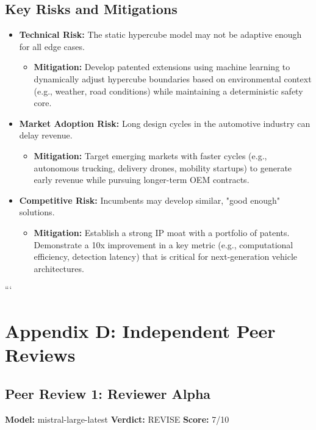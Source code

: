 \documentclass{article}
\begin{document}
\subsection{Key Risks and Mitigations}
\begin{itemize}
    \item \textbf{Technical Risk:} The static hypercube model may not be adaptive enough for all edge cases.
    \begin{itemize}
        \item \textbf{Mitigation:} Develop patented extensions using machine learning to dynamically adjust hypercube boundaries based on environmental context (e.g., weather, road conditions) while maintaining a deterministic safety core.
    \end{itemize}
    \item \textbf{Market Adoption Risk:} Long design cycles in the automotive industry can delay revenue.
    \begin{itemize}
        \item \textbf{Mitigation:} Target emerging markets with faster cycles (e.g., autonomous trucking, delivery drones, mobility startups) to generate early revenue while pursuing longer-term OEM contracts.
    \end{itemize}
    \item \textbf{Competitive Risk:} Incumbents may develop similar, "good enough" solutions.
    \begin{itemize}
        \item \textbf{Mitigation:} Establish a strong IP moat with a portfolio of patents. Demonstrate a 10x improvement in a key metric (e.g., computational efficiency, detection latency) that is critical for next-generation vehicle architectures.
    \end{itemize}
\end{itemize}
```


\section{Appendix D: Independent Peer Reviews}
\subsection{Peer Review 1: Reviewer Alpha}
\textbf{Model:} mistral-large-latest \quad \textbf{Verdict:} REVISE \quad \textbf{Score:} 7/10
\end{document}
